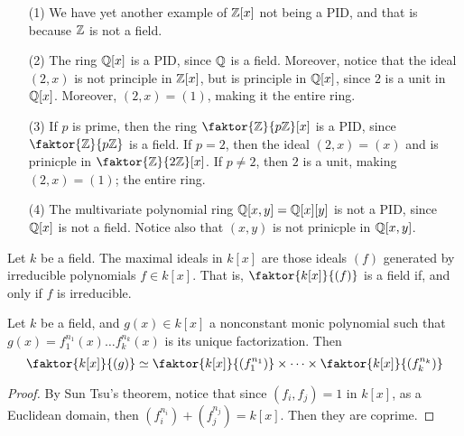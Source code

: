 \begin{example}\label{example_7.7}
  \begin{enumerate}
    \item[(1)] We have yet another example of $\mathbb{Z}[x]$ not being a PID, and
      that is because $\mathbb{Z}$ is not a field.

    \item[(2)] The ring $\mathbb{Q}[x]$ is a PID, since $\mathbb{Q}$ is a field. Moreover,
      notice that the ideal $(2,x)$ is not principle in $\mathbb{Z}[x]$, but is
      principle in $\mathbb{Q}[x]$, since $2$ is a unit in  $\mathbb{Q}[x]$. Moreover,
      $(2,x)=(1)$, making it the entire ring.

    \item[(3)] If $p$ is prime, then the ring  $\faktor{\Z}{p\Z}[x]$ is a
      PID, since $\faktor{\Z}{p\Z}$ is a field. If $p=2$, then the ideal
      $(2,x)=(x)$ and is prinicple in $\faktor{\Z}{2\Z}[x]$. If $p \neq 2$,
      then  $2$ is a unit, making  $(2,x)=(1)$; the entire ring.

    \item[(4)] The multivariate polynomial ring $\mathbb{Q}[x,y]=\mathbb{Q}[x][y]$ is not a
      PID, since $\mathbb{Q}[x]$ is not a field. Notice also that $(x,y)$ is not
      prinicple in $\mathbb{Q}[x,y]$.
  \end{enumerate}
\end{example}

\begin{lemma}\label{lemma_7.4.2}
  Let $k$ be a field. The maximal ideals in $k[x]$ are those ideals $(f)$
  generated by irreducible polynomials $f \in k[x]$. That is,
  $\faktor{k[x]}{(f)}$ is a field if, and only if $f$ is irreducible.
\end{lemma}

\begin{lemma}\label{lemma_7.4.4}
  Let $k$ be a field, and  $g(x) \in k[x]$ a nonconstant monic polynomial such
  that $g(x)=f_1^{n_1}(x) \dots f_k^{n_k}(x)$ is its unique factorization.
  Then
  \begin{equation*}
    \faktor{k[x]}{(g)} \simeq \faktor{k[x]}{(f_1^{n_1})} \times
    \dots \times \faktor{k[x]}{(f_k^{n_k})}
  \end{equation*}
\end{lemma}
\begin{proof}
  By Sun Tsu's theorem, notice that since $(f_i,f_j)=1$ in $k[x]$, as a
  Euclidean domain, then $(f_i^{n_i})+(f_j^{n_j})=k[x]$. Then they are
  coprime.
\end{proof}

